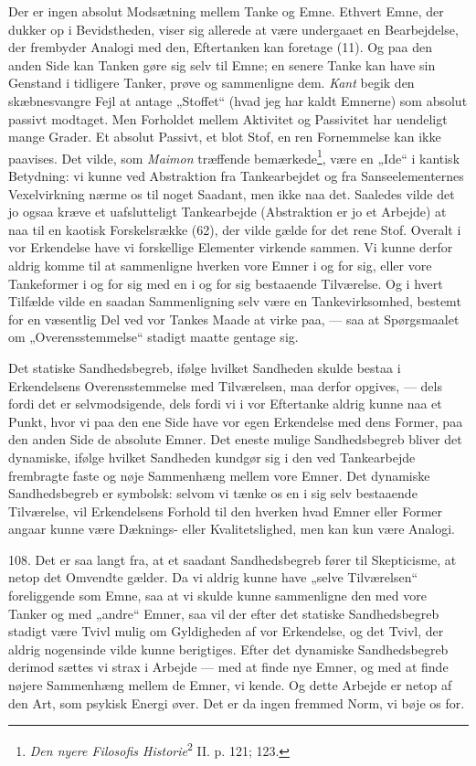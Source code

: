 \documentclass[12pt,a4paper]{book}
\newcommand{\opage}[1]{\marginnote{\footnotesize\textit{[#1]}}}
\newcommand{\apage}[1]{\marginnote{\footnotesize\textit{[#1]}}}
\begin{document}
Der er ingen absolut Modsætning mellem Tanke og Emne. Ethvert Emne, der dukker op i
Bevidstheden, viser sig allerede at være undergaaet en Bearbejdelse, der frembyder
Analogi med den, Eftertanken kan foretage (11). Og paa den anden Side kan Tanken
gøre sig selv til Emne; en senere Tanke kan have sin Genstand i tidligere Tanker,
prøve og sammenligne dem. \emph{Kant} begik den skæbnesvangre Fejl at antage
„Stoffet“ (hvad jeg har kaldt Emnerne) som absolut passivt modtaget. Men Forholdet
mellem Aktivitet og Passivitet har uendeligt mange Grader. Et absolut Passivt, et \apage{259}
blot Stof, en ren Fornemmelse kan ikke paavises. Det vilde, som \emph{Maimon}
træffende bemærkede\footnote{\emph{Den nyere Filosofis Historie}\textsuperscript{2}
II. p. 121; 123.}, være en „Ide“ i kantisk Betydning: vi kunne ved Abstraktion fra
Tankearbejdet og fra Sanseelementernes Vexelvirkning nærme os til noget Saadant,
men ikke naa det. Saaledes vilde det jo ogsaa kræve et uafslutteligt Tankearbejde
(Abstraktion er jo et Arbejde) at naa til en kaotisk Forskelsrække (62), der vilde
gælde for det rene Stof. Overalt i vor Erkendelse have vi forskellige Elementer
virkende sammen. Vi kunne derfor aldrig komme til at sammenligne hverken vore Emner
i og for sig, eller vore Tankeformer i og for sig med en i og for sig bestaaende
Tilværelse. Og i hvert Tilfælde vilde en saadan Sammenligning selv være en
Tankevirksomhed, bestemt for en væsentlig Del ved vor Tankes Maade at virke paa,
--- saa at Spørgsmaalet om „Overensstemmelse“ stadigt maatte gentage sig.

Det statiske Sandhedsbegreb, ifølge hvilket Sandheden skulde bestaa i Erkendelsens
Overensstemmelse med Tilværelsen, maa derfor opgives, --- dels fordi det er
selvmodsigende, dels fordi vi i vor Eftertanke aldrig kunne naa et Punkt, hvor vi
paa den ene Side have vor egen Erkendelse med dens Former, paa den anden Side de
absolute Emner. Det eneste mulige Sandhedsbegreb bliver det dynamiske, ifølge
hvilket Sandheden kundgør sig i den ved Tankearbejde frembragte faste og nøje
Sammenhæng mellem vore Emner. Det dynamiske Sandhedsbegreb er symbolsk: selvom vi
tænke os en i sig selv bestaaende Tilværelse, vil Erkendelsens Forhold til den
hverken hvad Emner eller Former angaar kunne være Dæknings- eller Kvalitetslighed,
men kan kun være Analogi.

108. Det er saa langt fra, at et saadant Sandhedsbegreb fører til Skepticisme, at
netop det Omvendte gælder. Da vi aldrig kunne have „selve Tilværelsen“ foreliggende
som Emne, saa at vi skulde kunne sammenligne den med vore Tanker og med „andre“
Emner, saa vil der efter det statiske Sandhedsbegreb stadigt være Tvivl mulig om
Gyldigheden af \opage{260} vor Erkendelse, og det Tvivl, der aldrig nogensinde vilde kunne
berigtiges. Efter det dynamiske Sandhedsbegreb derimod sættes vi strax i Arbejde
--- med at finde nye Emner, og med at finde nøjere Sammenhæng mellem de Emner, vi
kende. Og dette Arbejde er netop af den Art, som psykisk Energi øver. Det er da
ingen fremmed Norm, vi bøje os for.
\end{document}
